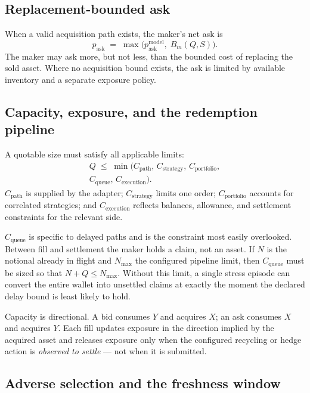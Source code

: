\documentclass[10pt,twocolumn]{article}
\theoremstyle{definition}
\newcommand{\Bm}{B_{m}}
\begin{document}
\subsection{Replacement-bounded ask}

When a valid acquisition path exists, the maker's net ask is
\begin{equation}
  p_{\mathrm{ask}} \;=\; \max\!\big(p^{\mathrm{model}}_{\mathrm{ask}},\; \Bm(Q,S)\big).
\end{equation}
The maker may ask more, but not less, than the bounded cost of replacing the sold asset. Where no acquisition
bound exists, the ask is limited by available inventory and a separate exposure policy.

\subsection{Capacity, exposure, and the redemption pipeline}

A quotable size must satisfy all applicable limits:
\begin{multline*}
  Q \;\le\; \min\big(C_{\mathrm{path}},\, C_{\mathrm{strategy}},\, C_{\mathrm{portfolio}},\\
                     C_{\mathrm{queue}},\, C_{\mathrm{execution}}\big).
\end{multline*}
$C_{\mathrm{path}}$ is supplied by the adapter; $C_{\mathrm{strategy}}$ limits one order;
$C_{\mathrm{portfolio}}$ accounts for correlated strategies; and $C_{\mathrm{execution}}$ reflects balances,
allowance, and settlement constraints for the relevant side.

$C_{\mathrm{queue}}$ is specific to delayed paths and is the constraint most easily overlooked. Between fill and
settlement the maker holds a claim, not an asset. If $N$ is the notional already in flight and $N_{\max}$ the
configured pipeline limit, then $C_{\mathrm{queue}}$ must be sized so that $N + Q \le N_{\max}$. Without this
limit, a single stress episode can convert the entire wallet into unsettled claims at exactly the moment the
declared delay bound is least likely to hold.

Capacity is directional. A bid consumes $Y$ and acquires $X$; an ask consumes $X$ and acquires $Y$. Each fill
updates exposure in the direction implied by the acquired asset and releases exposure only when the configured
recycling or hedge action is \emph{observed to settle} --- not when it is submitted.

\subsection{Adverse selection and the freshness window}
\end{document}
